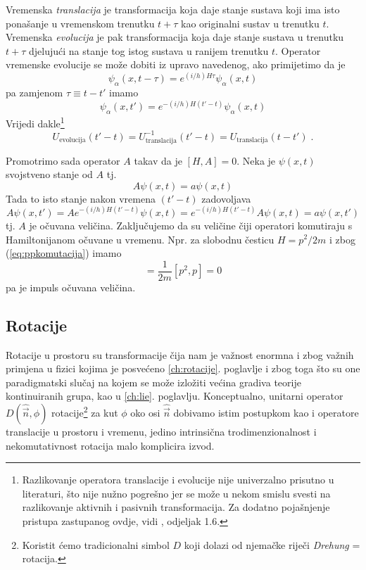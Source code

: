 Vremenska \emph{translacija} je transformacija koja daje
stanje sustava koji ima isto ponašanje u vremenskom
trenutku $t+\tau$ kao originalni sustav u trenutku $t$. Vremenska
\emph{evolucija} je pak transformacija koja 
daje stanje sustava u trenutku $t+\tau$ djelujući na stanje
tog istog sustava u ranijem trenutku $t$.
Operator vremenske evolucije se može dobiti iz upravo
navedenog, ako primijetimo da je
\begin{equation}
\psi_{\alpha}(x,t-\tau)=e^{(i/h)H\tau}\psi_{\alpha}(x,t)
\end{equation}
pa zamjenom $\tau\equiv t-t'$ imamo 
\begin{equation}
\psi_{\alpha}(x,t')=e^{-(i/h)H(t'-t)}\psi_{\alpha}(x,t)
\end{equation}
Vrijedi dakle\footnote{Razlikovanje operatora translacije i evolucije nije
    univerzalno prisutno u literaturi, što nije nužno pogrešno jer se može
    u nekom smislu svesti na razlikovanje aktivnih i pasivnih transformacija. 
    Za dodatno pojašnjenje pristupa zastupanog ovdje, vidi \cite{Greiner:1989},
odjeljak 1.6.}
\begin{equation}
U_{\text{evolucija}}(t' -t)=U^{-1}_{\text{translacija}}(t' -t)
=U_{\text{translacija}}(t -t') \;.
\end{equation}

Promotrimo sada operator $A$ takav da je
$[H,A]=0$. Neka je $\psi(x,t)$ svojstveno stanje od $A$ tj.
\begin{equation}
  A\psi(x,t) = a \psi(x,t)
\end{equation}
Tada to isto stanje nakon vremena $(t'-t)$ zadovoljava
\begin{equation}
  A\psi(x,t')= A e^{-(i/h)H(t'-t)} \psi(x,t) =
 e^{-(i/h)H(t'-t)} A \psi(x,t) = a \psi(x,t')
\end{equation}
tj. $A$ je očuvana veličina. Zaključujemo da su
veličine čiji operatori komutiraju s Hamiltonijanom očuvane u vremenu.
Npr. za slobodnu česticu $H=p^2/2m$ i zbog (\ref{eq:ppkomutacija}) imamo
\begin{equation}
   [H,p]=\frac{1}{2m}[p^2,p]=0
\end{equation}
pa je impuls očuvana veličina.



\subsection{Rotacije}

Rotacije u prostoru su transformacije čija nam je važnost
enormna i zbog važnih primjena u fizici kojima je posvećeno
\ref{ch:rotacije}. poglavlje i zbog toga što su one paradigmatski
slučaj na kojem se može izložiti većina gradiva teorije kontinuiranih grupa,
kao u \ref{ch:lie}. poglavlju.
Konceptualno, unitarni operator $D(\hat{\vec{n}}, \phi)$
rotacije\footnote{Koristit ćemo
  tradicionalni simbol $D$ koji dolazi od njemačke
riječi \emph{Drehung} = rotacija.} za kut $\phi$ oko osi $\hat{\vec{n}}$ dobivamo
istim postupkom kao i operatore translacije u prostoru i vremenu,
jedino intrinsična trodimenzionalnost i nekomutativnost rotacija
malo komplicira izvod.

